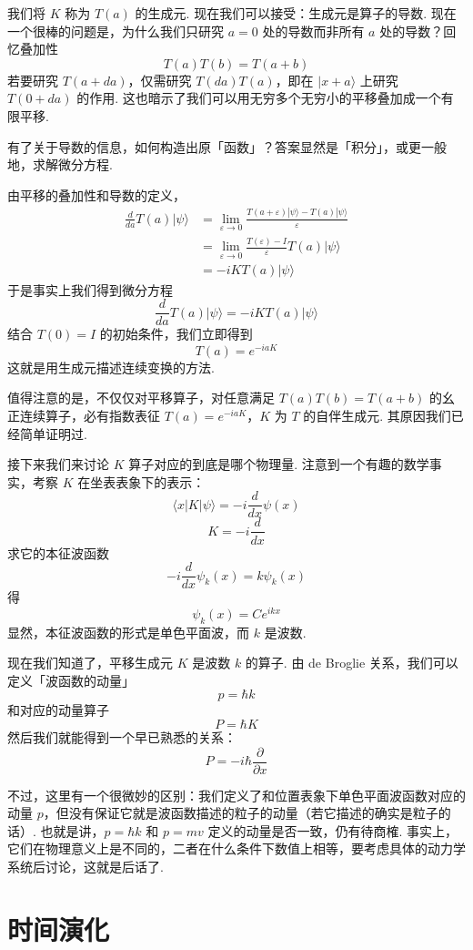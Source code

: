 我们将 \(K\) 称为 \(T(a)\) 的生成元. 现在我们可以接受：生成元是算子的导数. 现在一个很棒的问题是，为什么我们只研究 \(a=0\) 处的导数而非所有 \(a\) 处的导数？回忆叠加性
\[
T(a)T(b)=T(a+b)
\]
若要研究 \(T(a+da)\)，仅需研究 \(T(da)T(a)\)，即在 \(|x+a\rangle\) 上研究 \(T(0+da)\) 的作用. 这也暗示了我们可以用无穷多个无穷小的平移叠加成一个有限平移.


有了关于导数的信息，如何构造出原「函数」？答案显然是「积分」，或更一般地，求解微分方程.

由平移的叠加性和导数的定义，
\[
\begin{aligned}
\frac{d}{da}T(a)|\psi\rangle
&=\lim_{\varepsilon\to0}\frac{T(a+\varepsilon)|\psi\rangle-T(a)|\psi\rangle}{\varepsilon}\\
&=\lim_{\varepsilon\to0}\frac{T(\varepsilon)-I}{\varepsilon}T(a)|\psi\rangle\\
&=-iKT(a)|\psi\rangle
\end{aligned}
\]
于是事实上我们得到微分方程
\[
\frac{d}{da}T(a)|\psi\rangle=-iKT(a)|\psi\rangle
\]
结合 \(T(0)=I\) 的初始条件，我们立即得到
\[
T(a)=e^{-iaK}
\]
这就是用生成元描述连续变换的方法. 

值得注意的是，不仅仅对平移算子，对任意满足 \(T(a)T(b)=T(a+b)\) 的幺正连续算子，必有指数表征 \(T(a)=e^{-iaK}\)，\(K\) 为 \(T\) 的自伴生成元. 其原因我们已经简单证明过.

接下来我们来讨论 \(K\) 算子对应的到底是哪个物理量. 注意到一个有趣的数学事实，考察 \(K\) 在坐表表象下的表示：
\[
\langle x|K|\psi\rangle=-i\frac{d}{dx}\psi(x)
\]
\[
K=-i\frac{d}{dx}
\]
求它的本征波函数
\[
-i\frac{d}{dx}\psi_k(x)=k\psi_k(x)
\]
得
\[
\psi_k(x)=Ce^{ikx}
\]
显然，本征波函数的形式是单色平面波，而 \(k\) 是波数.

现在我们知道了，平移生成元 \(K\) 是波数 \(k\) 的算子. 由 de Broglie 关系，我们可以定义「波函数的动量」
\[
p=\hbar k
\]
和对应的动量算子
\[
P=\hbar K
\]
然后我们就能得到一个早已熟悉的关系：
\[
P=-i\hbar\frac{\partial}{\partial x}
\]

不过，这里有一个很微妙的区别：我们定义了和位置表象下单色平面波函数对应的动量 \(p\)，但没有保证它就是波函数描述的粒子的动量（若它描述的确实是粒子的话）. 也就是讲，\(p=\hbar k\) 和 \(p=mv\) 定义的动量是否一致，仍有待商榷. 
事实上，它们在物理意义上是不同的，二者在什么条件下数值上相等，要考虑具体的动力学系统后讨论，这就是后话了.

\section{时间演化}

